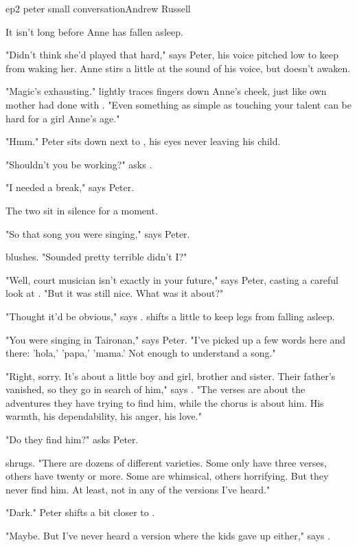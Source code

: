 \documentclass{book}
\begin{document}
\begin{childnode}{ep2 peter small conversation}{Andrew Russell}

    It isn't long before Anne has fallen asleep.

    "Didn't think she'd played that hard," says Peter, his voice pitched low to keep from waking her. Anne stirs a little at the sound of his voice, but doesn't awaken.

    "Magic's exhausting." \name{} lightly traces \hisher{} fingers down Anne's cheek, just like \hisher{} own mother had done with \himher{}. "Even something as simple as touching your talent can be hard for a girl Anne's age."

    "Hmm." Peter sits down next to \name{}, his eyes never leaving his child. 

    "Shouldn't you be working?" asks \name{}.

    "I needed a break," says Peter. 

    The two sit in silence for a moment.

    "So that song you were singing," says Peter.

    \name{} blushes. "Sounded pretty terrible didn't I?"

    "Well, court musician isn't exactly in your future," says Peter, casting a careful look at \name{}. "But it was still nice. What was it about?"

    "Thought it'd be obvious," says \name{}. \HeShe{} shifts a little to keep \hisher{} legs from falling asleep.

    "You were singing in Taironan," says Peter. "I've picked up a few words here and there: 'hola,' 'papa,' 'mama.' Not enough to understand a song."

    "Right, sorry. It's about a little boy and girl, brother and sister. Their father's vanished, so they go in search of him," says \name{}. "The verses are about the adventures they have trying to 
    find him, while the chorus is about him. His
    warmth, his dependability, his anger, his love."

    "Do they find him?" asks Peter.

    \name{} shrugs. "There are dozens of different varieties. Some only have three verses, others have twenty or more. Some are whimsical, others horrifying. But they never find him. At least, 
    not in any of the versions I've heard."

    "Dark." Peter shifts a bit closer to \name{}.

    "Maybe. But I've never heard a version where the kids gave up either," says \name{}.


\end{childnode}
\end{document}
